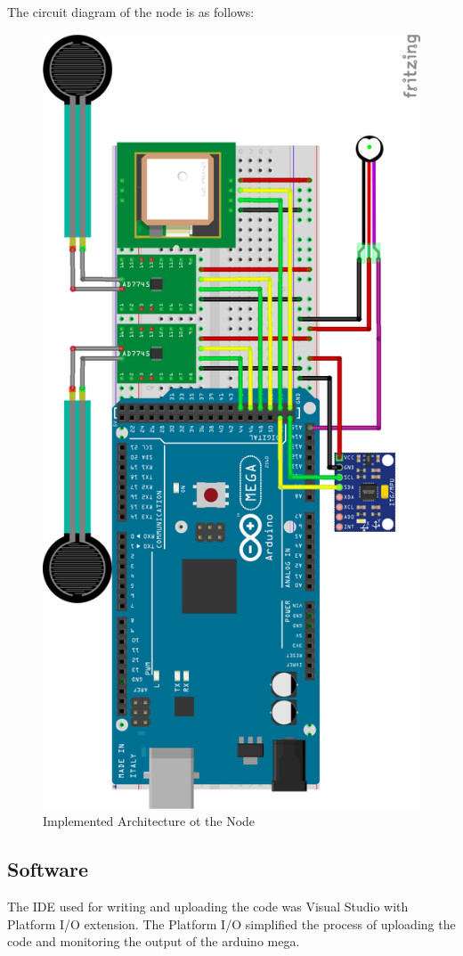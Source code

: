 		The circuit diagram of the node is as follows:

		\begin{figure}[h]
			\centering
			\includegraphics[width=0.8\linewidth]{gfx/node_diagram}
			\caption[]{Implemented Architecture ot the Node}
			\label{fig:architecture_node}
		\end{figure}

	\subsection{Software}
		The IDE used for writing and uploading the code was Visual Studio with Platform I/O extension. The Platform I/O simplified the process of uploading the code and monitoring the output of the arduino mega.

